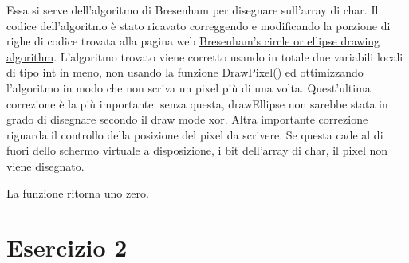 \documentclass{article}
\begin{document}
		Essa si serve dell'algoritmo di Bresenham per disegnare sull'array di char.
                Il codice dell'algoritmo è stato ricavato correggendo e modificando la porzione di righe di codice trovata alla pagina web
                \href{https://sites.google.com/site/ruslancray/lab/projects/bresenhamscircleellipsedrawingalgorithm/bresenham-s-circle-ellipse-drawing-algorithm}{Bresenham's circle or ellipse drawing algorithm}.
                L'algoritmo trovato viene corretto usando in totale due variabili locali di tipo int in meno, non usando la funzione DrawPixel()
                ed ottimizzando l'algoritmo in modo che non scriva un pixel più di una volta. Quest'ultima correzione è la più importante:
                senza questa, drawEllipse non sarebbe stata in grado di disegnare secondo il draw mode xor.
                Altra importante correzione riguarda il controllo della posizione del pixel da scrivere.
                Se questa cade al di fuori dello schermo virtuale a disposizione, i bit dell'array di char, il pixel non viene disegnato.
		
		La funzione ritorna uno zero.

\section{Esercizio 2}
\end{document}
